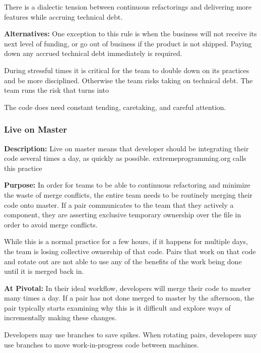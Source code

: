 \begin{table}[]
There is a dialectic tension \cite{RalphProcessTheories} between continuous refactorings and delivering more features while accruing technical debt. 

\textbf{Alternatives:} One exception to this rule is when the business will not receive its next level of funding, or go out of business if the product is not shipped. Paying down any accrued technical debt immediately is required. 

During stressful times it is critical for the team to double down on its practices and be more disciplined. Otherwise the team risks taking on technical debt. The team runs the risk that  turns into 

The code does need constant tending, caretaking, and careful attention.

\subsubsection{Live on Master}
\textbf{Description:} Live on master means that developer should be integrating their code several times a day, as quickly as possible. extremeprogramming.org calls this practice  \cite{IntegrateOften} 

\textbf{Purpose:} In order for teams to be able to continuous refactoring and minimize the waste of merge conflicts, the entire team needs to be routinely merging their code onto master.  If a pair communicates to the team that they actively  a component, they are asserting exclusive temporary ownership over the file in order to avoid merge conflicts. 

While this is a normal practice for a few hours, if it happens for multiple days, the team is losing collective ownership of that code. Pairs that work on that code and rotate out are not able to use any of the benefits of the work being done until it is merged back in. 

\textbf{At Pivotal:} In their ideal workflow, developers will merge their code to master many times a day. If a pair has not done merged to master by the afternoon, the pair typically starts examining why this is it difficult and explore ways of incrementally making these changes. 

Developers may use branches to save spikes. When rotating pairs, developers may use branches to move work-in-progress code between machines.  


\end{table}
